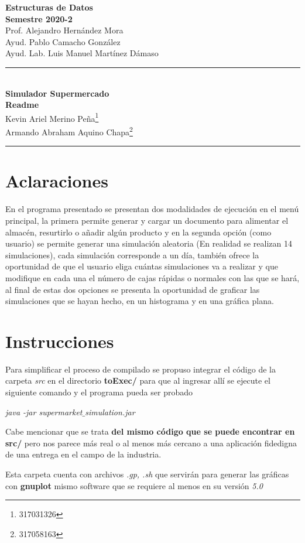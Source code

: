 \documentclass[letterpaper,11pt]{article}
\begin{document}
\begin{center}
\vspace{-114pt}
\textbf{\large Estructuras de Datos}\\
\textbf{ Semestre 2020-2}\\
Prof. Alejandro Hernández Mora\\
Ayud. Pablo Camacho González  \\ 
Ayud. Lab. Luis Manuel Martínez Dámaso   \\
\rule{17cm}{0.3mm}\\
\textbf{Simulador Supermercado}\\
\huge\textbf{Readme}\\[0.1cm]
\normalsize Kevin Ariel Merino Peña\footnote{317031326}\\
Armando Abraham Aquino Chapa\footnote{317058163}\\
\rule{17cm}{0.3mm}
\end{center}
\section*{Aclaraciones}
En el programa presentado se presentan dos modalidades de ejecución en el menú principal, la primera permite generar y cargar un documento para alimentar el almacén, resurtirlo o añadir algún producto y en la segunda opción (como usuario) se permite generar una simulación aleatoria (En realidad se realizan 14 simulaciones), cada simulación corresponde a un día, también ofrece la oportunidad de que el usuario eliga cuántas simulaciones va a realizar y que modifique en cada una el número de cajas rápidas o normales con las que se hará, al final de estas dos opciones se presenta la oportunidad de graficar las simulaciones que se hayan hecho, en un histograma y en una gráfica plana.
\section*{Instrucciones}
Para simplificar el proceso de compilado se propuso integrar el  código de la carpeta \textit{src} en el directorio \textbf{toExec/} para que al ingresar allí se ejecute el siguiente comando y el programa pueda ser probado
\begin{center}
	\textit{java -jar supermarket$\_$simulation.jar}
\end{center}
Cabe mencionar que se trata \textbf{del mismo código que se puede encontrar en src/} pero nos parece más real o al menos más cercano a una aplicación fidedigna de una entrega en el campo de la industria.


Esta carpeta cuenta con archivos \textit{.gp, .sh} que servirán para generar las gráficas con \textbf{gnuplot} mismo software que se requiere al menos en su versión \textit{5.0}
\end{document}
